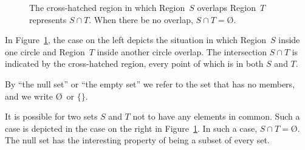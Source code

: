 \begin{figure}
   \begin{center}
   \end{center}
   \caption{The cross-hatched region in which Region~$S$ overlaps Region~$T$
   represents $S \cap T$. When there be no overlap, $S \cap T = \text{\O}$.}
\label{fig:intersection}
\end{figure}

\noindent In Figure~\ref{fig:intersection}, the case on the left depicts the
situation in which Region~$S$ inside one circle and Region~$T$ inside another
circle overlap. The intersection $S \cap T$ is indicated by the cross-hatched
region, every point of which is in both $S$ and $T$.

\begin{definition}
   By ``the null set'' or ``the empty set'' we refer to the set that has no
   members, and we write \O\ or $\{\}$.
\end{definition}

\noindent It is possible for two sets $S$ and $T$ not to have any elements in
common.  Such a case is depicted in the case on the right in
Figure~\ref{fig:intersection}.  In such a case, $S \cap T = \text{\O}$.  The
null set has the interesting property of being a subset of every set.

